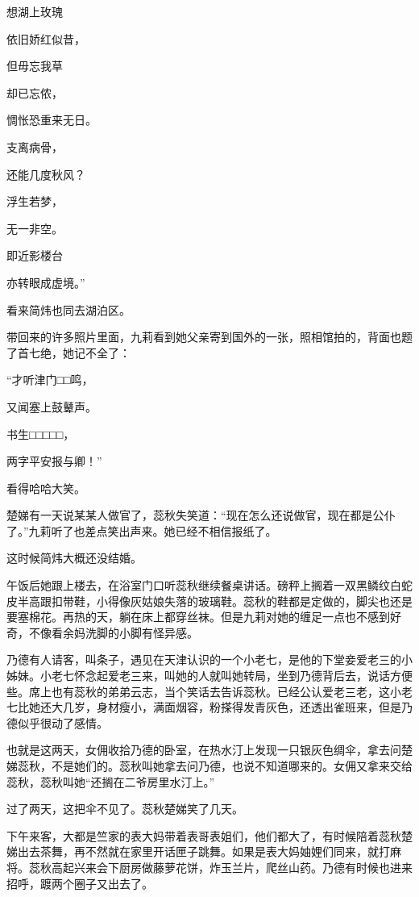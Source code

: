 \par 想湖上玫瑰
\par 依旧娇红似昔，
\par 但毋忘我草
\par 却已忘侬，
\par 惆怅恐重来无日。
\par 支离病骨，
\par 还能几度秋风？
\par 浮生若梦，
\par 无一非空。
\par 即近影楼台
\par 亦转眼成虚境。”
\par 看来简炜也同去湖泊区。
\par 带回来的许多照片里面，九莉看到她父亲寄到国外的一张，照相馆拍的，背面也题了首七绝，她记不全了：
\par “才听津门□□鸣，
\par 又闻塞上鼓鼙声。
\par 书生□□□□□，
\par 两字平安报与卿！”
\par 看得哈哈大笑。
\par 楚娣有一天说某某人做官了，蕊秋失笑道：“现在怎么还说做官，现在都是公仆了。”九莉听了也差点笑出声来。她已经不相信报纸了。
\par 这时候简炜大概还没结婚。
\par 午饭后她跟上楼去，在浴室门口听蕊秋继续餐桌讲话。磅秤上搁着一双黑鳞纹白蛇皮半高跟扣带鞋，小得像灰姑娘失落的玻璃鞋。蕊秋的鞋都是定做的，脚尖也还是要塞棉花。再热的天，躺在床上都穿丝袜。但是九莉对她的缠足一点也不感到好奇，不像看余妈洗脚的小脚有怪异感。
\par 乃德有人请客，叫条子，遇见在天津认识的一个小老七，是他的下堂妾爱老三的小姊妹。小老七怀念起爱老三来，叫她的人就叫她转局，坐到乃德背后去，说话方便些。席上也有蕊秋的弟弟云志，当个笑话去告诉蕊秋。已经公认爱老三老，这小老七比她还大几岁，身材瘦小，满面烟容，粉搽得发青灰色，还透出雀班来，但是乃德似乎很动了感情。
\par 也就是这两天，女佣收拾乃德的卧室，在热水汀上发现一只银灰色绸伞，拿去问楚娣蕊秋，不是她们的。蕊秋叫她拿去问乃德，也说不知道哪来的。女佣又拿来交给蕊秋，蕊秋叫她“还搁在二爷房里水汀上。”
\par 过了两天，这把伞不见了。蕊秋楚娣笑了几天。
\par 下午来客，大都是竺家的表大妈带着表哥表姐们，他们都大了，有时候陪着蕊秋楚娣出去茶舞，再不然就在家里开话匣子跳舞。如果是表大妈妯娌们同来，就打麻将。蕊秋高起兴来会下厨房做藤萝花饼，炸玉兰片，爬丝山药。乃德有时候也进来招呼，踱两个圈子又出去了。
